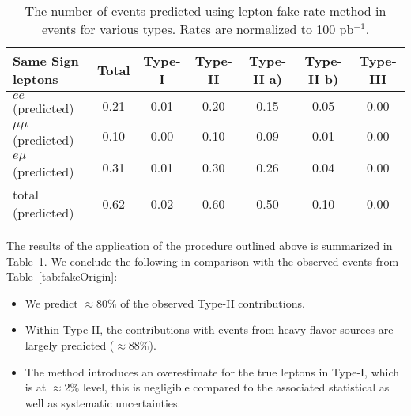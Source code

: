\vspace{2mm}
\begin{table}[hbt]
\begin{center}
\begin{tabular}{|l|c|c|c|c|c|c|}\hline
Same Sign leptons & Total &      Type-I &  Type-II & Type-II a) & Type-II b) & Type-III \\ \hline
$ee$ (predicted) &	0.21 &	0.01 &	0.20 &	0.15 &	0.05 &	0.00 \\
$\mu\mu$ (predicted) &	0.10 &	0.00 &	0.10 &	0.09 &	0.01 &	0.00 \\
$e\mu$ (predicted) &	0.31 &	0.01 &	0.30 &	0.26 &	0.04 &	0.00 \\
total (predicted) &	0.62 &	0.02 &	0.60 &	0.50 &	0.10 &	0.00 \\
\hline
\end{tabular}
\caption{ The number of events predicted using lepton fake rate method in \ttbar events for various types. 
Rates are normalized to 100 pb$^{-1}$.\label{tab:LeptonFakePredict}}
\end{center}
\end{table}
 The results of the application of the procedure outlined above is summarized in Table~\ref{tab:LeptonFakePredict}. 
We conclude the following in comparison with the observed events from Table~\ref{tab:fakeOrigin}:


\begin{itemize}
\item We predict $\approx 80 \%$ of the observed Type-II contributions.
\item Within Type-II, the contributions with events from heavy flavor sources are largely predicted ($\approx 88 \%$).
\item The method introduces an overestimate for the true leptons in Type-I, which is at $\approx 2 \%$ level, 
this is negligible compared to the associated statistical as well as systematic uncertainties.
\end{itemize}
